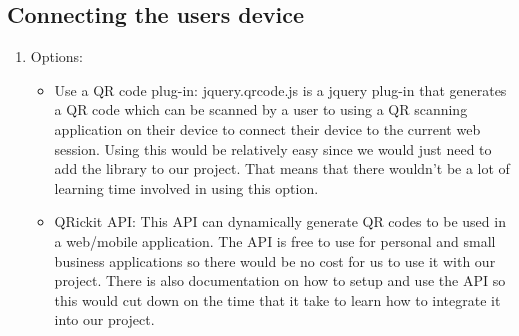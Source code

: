 \documentclass[letterpaper, 10pt, draftclsnofoot, compsoc, onecolumn]{IEEEtran}
\begin{document}
	\subsection{Connecting the users device}
		\begin{enumerate}
			\item{Options:}
				\begin{itemize}
					\item Use a QR code plug-in: jquery.qrcode.js is a jquery plug-in that generates a QR code which can be scanned by a user to using a QR scanning application on
					their device to connect their device to the current web session. Using this would be relatively easy since we would just need to add the library to our project. That
					means that there wouldn't be a lot of learning time involved in using this option.

					\item QRickit API: This API can dynamically generate QR codes to be used in a web/mobile application. The API is free to use for personal and small business 
					applications so there would be no cost for us to use it with our project. There is also documentation on how to setup and use the API so this would cut down 
					on the time that it take to learn how to integrate it into our project. 


\end{itemize}
\end{enumerate}
\end{document}
